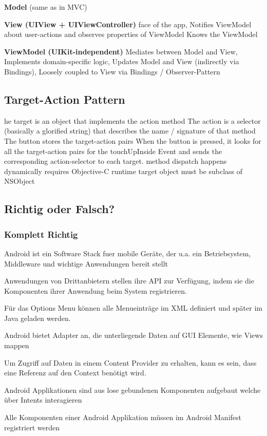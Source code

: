 \textbf{Model} (same as in MVC)

\textbf{View (UIView + UIViewController)}
face of the app,
Notifies ViewModel about user-actions and observes properties of ViewModel
Knows the ViewModel

\textbf{ViewModel (UIKit-independent)}
Mediates between Model and View,
Implements domain-specific logic,
Updates Model and View (indirectly via Bindings),
Loosely coupled to View via Bindings / Observer-Pattern


\subsection{Target-Action Pattern}
he target is an object that implements the action method
The action is a selector (basically a glorified string) that describes the name /
signature of that method
The button stores the target-action pairs
When the button is pressed, it looks for all the target-action pairs for the
touchUpInside Event and sends the corresponding action-selector to each target.
method dispatch happens dynamically requires Objective-C runtime
target object must be subclass of NSObject

\subsection{Richtig oder Falsch?}
\subsubsection{Komplett Richtig}
Android ist ein Software Stack fuer mobile Geräte, der u.a. ein Betriebsystem,
Middleware und wichtige Anwendungen bereit stellt

Anwendungen von Drittanbietern stellen ihre API zur Verfügung, indem sie die
Komponenten ihrer Anwendung beim System registrieren.

Für das Options Menu können alle Menueinträge im XML definiert und später im
Java geladen werden.

Android bietet Adapter an, die unterliegende Daten auf GUI Elemente, wie Views
mappen

Um Zugriff auf Daten in einem Content Provider zu erhalten, kann es sein, dass
eine Referenz auf den Context benötigt wird.

Android Applikationen sind aus lose gebundenen Komponenten
aufgebaut welche über Intents interagieren

Alle Komponenten einer Android Applikation müssen im Android
Manifest registriert werden

